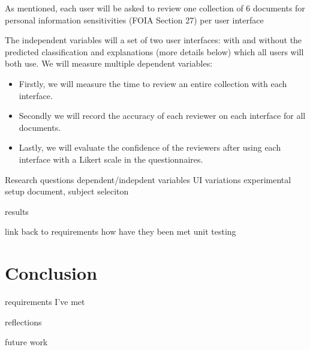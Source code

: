 \documentclass{l4proj}
\begin{document}
As mentioned, each user will be asked to review one collection of 6 documents for personal information sensitivities (FOIA Section 27) per user interface

The independent variables will a set of two user interfaces: with and without the predicted classification and explanations (more details below) which all users will both use. We will measure multiple dependent variables:

\begin{itemize}
    \item Firstly, we will measure the time to review an entire collection with each interface.
    \item Secondly we will record the accuracy of each reviewer on each interface for all documents.
    \item Lastly, we will evaluate the confidence of the reviewers after using each interface with a Likert scale in the questionnaires.
\end{itemize}




Research questions
dependent/indepdent variables
UI variations
experimental setup
document, subject seleciton


results


link back to requirements
how have they been met
unit testing




\chapter{Conclusion}


requirements I've met


reflections

future work

%
% 
\end{document}

